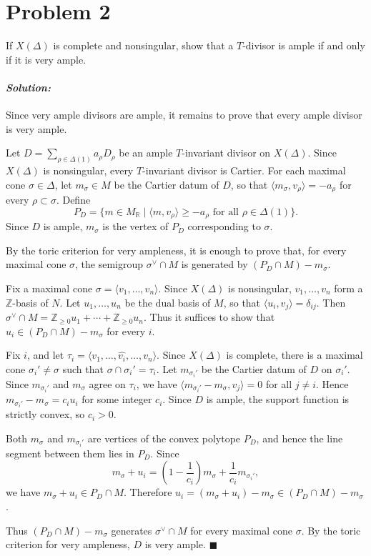 \documentclass[12pt, a4paper]{article}
\newenvironment{solution}
  {\paragraph{\textit{Solution:}}\par\medskip}
  {\hfill$\blacksquare$\vspace{0.1cm}}
\begin{document}
\section*{Problem 2}
If $X(\Delta)$ is complete and nonsingular, show that a $T$-divisor is ample if and only if it is very ample. 
\begin{solution}
    Since very ample divisors are ample, it remains to prove that every
ample divisor is very ample.

Let \(D=\sum_{\rho\in\Delta(1)}a_\rho D_\rho\) be an ample
\(T\)-invariant divisor on \(X(\Delta)\).  Since \(X(\Delta)\) is
nonsingular, every \(T\)-invariant divisor is Cartier.  For each maximal
cone \(\sigma\in\Delta\), let \(m_\sigma\in M\) be the Cartier datum of
\(D\), so that \(\langle m_\sigma,v_\rho\rangle=-a_\rho\) for every
\(\rho\subset\sigma\).  Define
\[
P_D
=
\{m\in M_{\mathbb R}\mid
\langle m,v_\rho\rangle\ge -a_\rho
\text{ for all }\rho\in\Delta(1)\}.
\]
Since \(D\) is ample, \(m_\sigma\) is the vertex of \(P_D\) corresponding
to \(\sigma\).

By the toric criterion for very ampleness, it is enough to prove that,
for every maximal cone \(\sigma\), the semigroup \(\sigma^\vee\cap M\)
is generated by \((P_D\cap M)-m_\sigma\).

Fix a maximal cone \(\sigma=\langle v_1,\dots,v_n\rangle\).  Since
\(X(\Delta)\) is nonsingular, \(v_1,\dots,v_n\) form a
\(\mathbb Z\)-basis of \(N\).  Let \(u_1,\dots,u_n\) be the dual basis of
\(M\), so that \(\langle u_i,v_j\rangle=\delta_{ij}\).  Then
\(\sigma^\vee\cap M=\mathbb Z_{\ge0}u_1+\cdots+\mathbb Z_{\ge0}u_n\).
Thus it suffices to show that \(u_i\in (P_D\cap M)-m_\sigma\) for every
\(i\).

Fix \(i\), and let
\(\tau_i=\langle v_1,\dots,\widehat{v_i},\dots,v_n\rangle\).  Since
\(X(\Delta)\) is complete, there is a maximal cone
\(\sigma_i'\neq\sigma\) such that \(\sigma\cap\sigma_i'=\tau_i\).  Let
\(m_{\sigma_i'}\) be the Cartier datum of \(D\) on \(\sigma_i'\).  Since
\(m_{\sigma_i'}\) and \(m_\sigma\) agree on \(\tau_i\), we have
\(\langle m_{\sigma_i'}-m_\sigma,v_j\rangle=0\) for all \(j\neq i\).
Hence \(m_{\sigma_i'}-m_\sigma=c_i u_i\) for some integer \(c_i\).
Since \(D\) is ample, the support function is strictly convex, so
\(c_i>0\).

Both \(m_\sigma\) and \(m_{\sigma_i'}\) are vertices of the convex
polytope \(P_D\), and hence the line segment between them lies in
\(P_D\).  Since
\[
m_\sigma+u_i
=
\left(1-\frac1{c_i}\right)m_\sigma
+
\frac1{c_i}m_{\sigma_i'},
\]
we have \(m_\sigma+u_i\in P_D\cap M\).  Therefore
\(u_i=(m_\sigma+u_i)-m_\sigma\in (P_D\cap M)-m_\sigma\).

Thus \((P_D\cap M)-m_\sigma\) generates \(\sigma^\vee\cap M\) for every
maximal cone \(\sigma\).  By the toric criterion for very ampleness,
\(D\) is very ample.
\end{solution}
\end{document}
